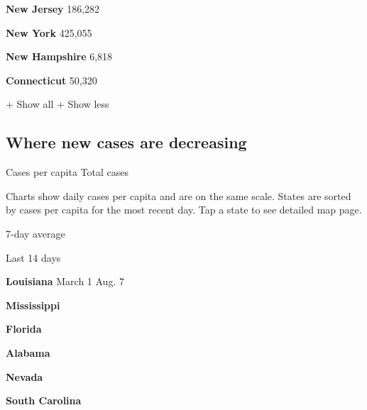 \textbf{New Jersey} 186,282

\href{https://www.nytimes.com/interactive/2020/us/new-york-coronavirus-cases.html}{}

\textbf{New York} 425,055

\href{https://www.nytimes.com/interactive/2020/us/new-hampshire-coronavirus-cases.html}{}

\textbf{New Hampshire} 6,818

\href{https://www.nytimes.com/interactive/2020/us/connecticut-coronavirus-cases.html}{}

\textbf{Connecticut} 50,320

+ Show all + Show less

\hypertarget{where-new-cases-are-decreasing}{%
\subsection{Where new cases are
decreasing}\label{where-new-cases-are-decreasing}}

Cases per capita Total cases

Charts show daily cases per capita and are on the same scale. States are
sorted by cases per capita for the most recent day. Tap a state to see
detailed map page.

\href{https://www.nytimes.com/interactive/2020/us/louisiana-coronavirus-cases.html}{}

7-day average

Last 14 days

\textbf{Louisiana} March 1 Aug. 7

\href{https://www.nytimes.com/interactive/2020/us/mississippi-coronavirus-cases.html}{}

\textbf{Mississippi}

\href{https://www.nytimes.com/interactive/2020/us/florida-coronavirus-cases.html}{}

\textbf{Florida}

\href{https://www.nytimes.com/interactive/2020/us/alabama-coronavirus-cases.html}{}

\textbf{Alabama}

\href{https://www.nytimes.com/interactive/2020/us/nevada-coronavirus-cases.html}{}

\textbf{Nevada}

\href{https://www.nytimes.com/interactive/2020/us/south-carolina-coronavirus-cases.html}{}

\textbf{South Carolina}

\href{https://www.nytimes.com/interactive/2020/us/arizona-coronavirus-cases.html}{}

